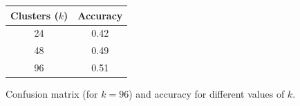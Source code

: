 \documentclass[12pt]{article}
\begin{document}
  \begin{figure}[H]
    \centering
    \caption*{Confusion matrix (for \( k = 96 \)) and accuracy for different values of \( k \).}
    \quad\quad\quad
    \begin{tabular}[b]{cc}
			\toprule
      Clusters (\( k \)) & Accuracy \\
      \midrule
      24  & 0.42 \\
      48  & 0.49 \\
      96  & 0.51 \\
      \bottomrule
    \end{tabular}
  \end{figure}



\renewcommand*{\refname}{References}
\printbibliography
\end{document}
